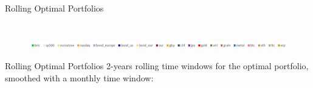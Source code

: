\documentclass[aspectratio=169]{beamer}
\begin{document}
\begin{frame}{Rolling Optimal Portfolios}
\begin{columns}
\begin{column}{0.3\textwidth}
\begin{figure}
            \end{figure}
		\end{column}
	\end{columns}
	\begin{figure}
	    \centering
	    \includegraphics[width=13.5cm]{Images/legend_roll.PNG}
	\end{figure}
\end{frame}

\begin{frame}[noframenumbering]{Rolling Optimal Portfolios}
2-years rolling time windows for the optimal portfolio, smoothed with a monthly time window:
	\begin{columns}
		\begin{column}{0.1\textwidth}
		    \bigskip
		    \bigskip
		    

\end{column}
\end{columns}
\end{frame}
\end{document}
